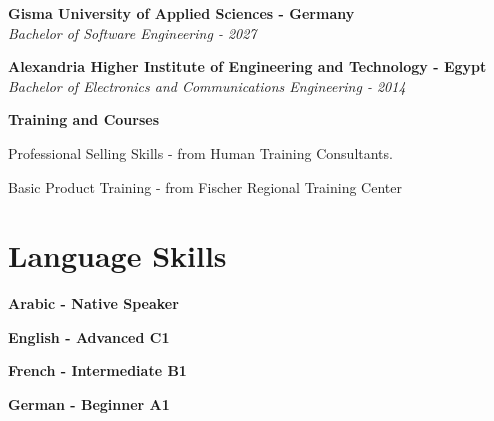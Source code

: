 \documentclass[letterpaper,12pt]{article}
\newcommand{\heading}[2]{
  \hspace{10pt}#1\hfill#2\\
}
\newcommand{\headingBf}[2]{
  \heading{\textbf{#1}}{\textbf{#2}}
}
\newcommand{\headingIt}[2]{
  \heading{\textit{#1}}{\textit{#2}}
}
\newenvironment{resume_list}{
  \vspace{-7pt}
  \begin{itemize}[itemsep=-2px, parsep=1pt, leftmargin=30pt]
}{
  \end{itemize}
}
\begin{document}
  \headingBf{Gisma University of Applied Sciences - Germany}{} %
  \headingIt{Bachelor of Software Engineering - 2027}{}
  \vspace{5pt}
  \headingBf{Alexandria Higher Institute of Engineering and Technology - Egypt}{} %
  \headingIt{Bachelor of Electronics and Communications Engineering - 2014}{}
  \vspace{5pt}
  \headingBf{Training and Courses}{}
  \begin{resume_list}
    \item Professional Selling Skills \hspace{2pt}- from Human Training Consultants.
    \item Basic Product Training - from Fischer Regional Training Center
  \end{resume_list}


  \section{Language Skills}

  \headingBf{Arabic - Native Speaker}{}
    \vspace{5pt}
  \headingBf{English - Advanced C1}{}
    \vspace{5pt}
  \headingBf{French - Intermediate B1}{}
    \vspace{5pt}
  \headingBf{German - Beginner A1}{}
\end{document}
